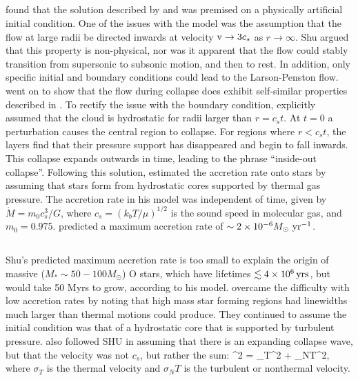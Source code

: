 \documentclass[../dissertation.tex]{subfiles}
\begin{document}
\subsection{\citet{1977ApJ...214..488S}} \label{subsec:Shu_review}
\citet{1977ApJ...214..488S} found that the solution described by \citet{1969MNRAS.145..271L} and \citet{1969MNRAS.144..425P} was premised on a physically artificial initial condition.
One of the issues with the model was the assumption that the flow at large radii be directed inwards at velocity ${\rm v} \rightarrow 3c_s$ as $r \rightarrow \infty$. 
Shu argued that this property is non-physical, nor was it apparent that the flow could stably transition from supersonic to subsonic motion, and then to rest. 
In addition, only specific initial and boundary conditions could lead to the Larson-Penston flow.
\citet{1977ApJ...214..488S} went on to show that the flow during collapse does exhibit self-similar properties described in \citet{1969MNRAS.145..271L}.
To rectify the issue with the boundary condition, \citet{1977ApJ...214..488S} explicitly assumed that the cloud is hydrostatic for radii larger than $r = c_s t$. 
At $t=0$ a perturbation causes the central region to collapse. 
For regions where $r < c_s t$, the layers find that their pressure support has disappeared and begin to fall inwards. 
This collapse expands outwards in time, leading to the phrase ``inside-out collapse''. 
Following this solution, \citet{1977ApJ...214..488S} estimated the accretion rate onto 
stars by assuming that stars form from hydrostatic cores supported by thermal gas pressure. 
The accretion rate in his model was independent of time, given by $\dot{M} = m_0c_s^3/G$, where $c_s = (k_b T / \mu)^{1/2}$  is the sound
speed in molecular gas, and $m_0 = 0.975$. 
\citet{1977ApJ...214..488S} predicted a maximum accretion rate of $\sim 2\times10^{-6} M_\odot\,\,\rm yr^{-1}$.

\subsection{\citet{1992ApJ...396..631M}}%
Shu's predicted maximum  accretion rate is too small to explain the origin of massive ($M_*\sim50-100M_\odot$) O stars, which have lifetimes $\lesssim 4\times10^6\,\rm yrs$, but would take 50 Myrs to grow, according to his model.
\citet{1992ApJ...396..631M}  overcame the difficulty with low accretion rates by noting that high mass star forming regions had linewidths much larger than thermal motions could produce. 
They continued to assume the initial condition was that of a hydrostatic core that is supported by turbulent pressure. 
\citet{1992ApJ...396..631M} also followed SHU in assuming that there is an expanding collapse wave, but that the velocity was not $c_s$, but rather the sum: 
%
\be
\sigma^2 = \sigma_T^2 + \sigma_{NT}^2, 
\ee
%
where $\sigma_T$ is the thermal velocity and $\sigma_NT$ is the turbulent or nonthermal velocity. 
\end{document}

